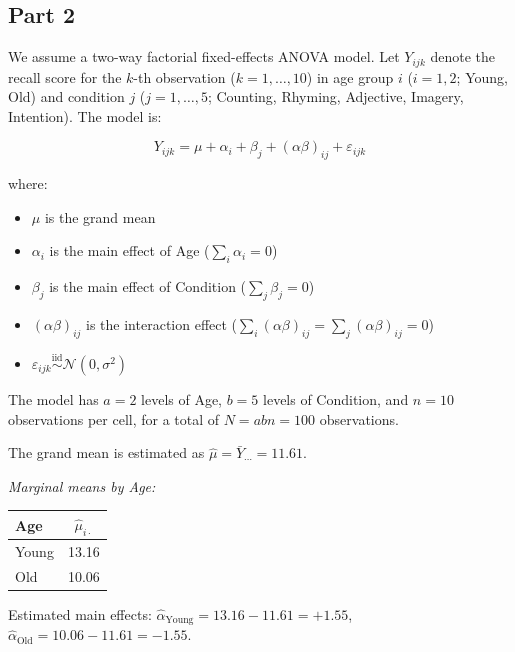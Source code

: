 \documentclass[letterpaper]{article}
\begin{document}
	\subsection{Part 2}

	
	We assume a {two-way factorial fixed-effects ANOVA} model. Let $Y_{ijk}$ denote the recall score for the $k$-th observation ($k = 1, \ldots, 10$) in age group $i$ ($i = 1, 2$; Young, Old) and condition $j$ ($j = 1, \ldots, 5$; Counting, Rhyming, Adjective, Imagery, Intention). The model is:
	
	\[
	Y_{ijk} = \mu + \alpha_i + \beta_j + (\alpha\beta)_{ij} + \varepsilon_{ijk}
	\]
	
	where:
	\begin{itemize}
		\item $\mu$ is the grand mean
		\item $\alpha_i$ is the main effect of Age ($\sum_i \alpha_i = 0$)
		\item $\beta_j$ is the main effect of Condition ($\sum_j \beta_j = 0$)
		\item $(\alpha\beta)_{ij}$ is the interaction effect ($\sum_i (\alpha\beta)_{ij} = \sum_j (\alpha\beta)_{ij} = 0$)
		\item $\varepsilon_{ijk} \overset{\text{iid}}{\sim} \mathcal{N}(0, \sigma^2)$
	\end{itemize}
	
	The model has $a = 2$ levels of Age, $b = 5$ levels of Condition, and $n = 10$ observations per cell, for a total of $N = abn = 100$ observations.
	
	
	The grand mean is estimated as $\hat{\mu} = \bar{Y}_{\cdots} = 11.61$.
	
	\vspace{0.5em}
	\noindent\textit{Marginal means by Age:}
	
	\begin{table}[H]
		\centering
		\begin{tabular}{lc}
			\toprule
			Age & $\hat{\mu}_{i\cdot}$ \\
			\midrule
			Young & 13.16 \\
			Old   & 10.06 \\
			\bottomrule
		\end{tabular}
	\end{table}
	
	\noindent Estimated main effects: $\hat{\alpha}_{\text{Young}} = 13.16 - 11.61 = +1.55$, \; $\hat{\alpha}_{\text{Old}} = 10.06 - 11.61 = -1.55$.
	
\end{document}
